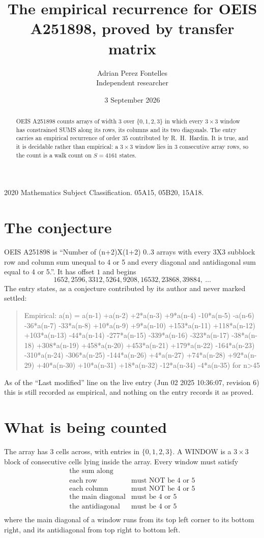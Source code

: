 \documentclass[11pt,a4paper]{article}
\title{The empirical recurrence for OEIS A251898, proved by transfer matrix}
\author{Adrian Perez Fontelles\\ \small Independent researcher}
\date{3 September 2026}
\theoremstyle{plain}
\theoremstyle{definition}
\begin{document}
\maketitle

\begin{abstract}
OEIS A251898 counts arrays of width $3$ over $\{0,1,2,3\}$ in which every $3\times3$ window has
constrained SUMS along its rows, its columns and its two diagonals. The entry carries an
empirical recurrence of order $35$ contributed by R.~H.~Hardin. It is true, and it is
decidable rather than empirical: a $3\times3$ window lies in $3$ consecutive array rows,
so the count is a walk count on $S=4161$ states.
\end{abstract}

\noindent\small 2020 Mathematics Subject Classification. 05A15, 05B20, 15A18.\normalsize

\section{The conjecture}

OEIS A251898 is ``Number of (n+2)X(1+2) 0..3 arrays with every 3X3 subblock row and column sum unequal to 4 or 5 and every diagonal and antidiagonal sum equal to 4 or 5.''. It has offset $1$ and begins
\[
1652, 2596, 3312, 5264, 9208, 16532, 23868, 39884,\ \dots
\]
The entry states, as a conjecture contributed by its author and never marked settled:
\begin{quote}
Empirical: a(n) = a(n-1) +a(n-2) +2*a(n-3) +9*a(n-4) -10*a(n-5) -a(n-6) -36*a(n-7) -33*a(n-8) +10*a(n-9) +9*a(n-10) +153*a(n-11) +118*a(n-12) +103*a(n-13) -44*a(n-14) -277*a(n-15) -339*a(n-16) -323*a(n-17) -38*a(n-18) +308*a(n-19) +458*a(n-20) +453*a(n-21) +179*a(n-22) -164*a(n-23) -310*a(n-24) -306*a(n-25) -144*a(n-26) +4*a(n-27) +74*a(n-28) +92*a(n-29) +40*a(n-30) +10*a(n-31) +18*a(n-32) -12*a(n-34) -4*a(n-35) for n>45
\end{quote}
As of the ``Last modified'' line on the live entry (Jun 02 2025 10:36:07, revision 6) this is still
recorded as empirical, and nothing on the entry records it as proved.

\section{What is being counted}

The array has $3$ cells across, with entries in $\{0,1,2,3\}$. A WINDOW is a $3\times3$ block
of consecutive cells lying inside the array. Every window must satisfy
\[
\begin{array}{ll}
\text{the sum along} & \text{} \\[2pt]
\text{each row} & \text{must NOT be 4 or 5} \\
\text{each column} & \text{must NOT be 4 or 5} \\
\text{the main diagonal} & \text{must be 4 or 5} \\
\text{the antidiagonal} & \text{must be 4 or 5} \\
\end{array}
\]
where the main diagonal of a window runs from its top left corner to its bottom right, and its
antidiagonal from top right to bottom left.
\end{document}
